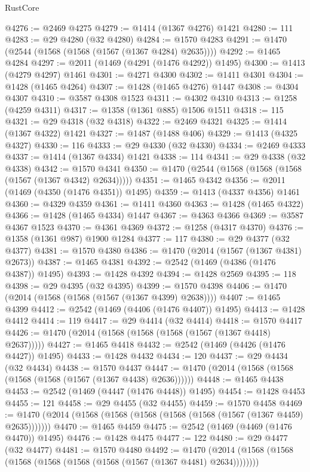\begin{lexlean}{RustCore}
\begin{coremodule}
@4276 := @2469 @4275
@4279 := @1414 (@1367 @4276) @1421
@4280 := 111
@4283 := @29 @4280 (@32 @4280)
@4284 := @1570 @4283
@4291 := @1470 (@2544 (@1568 (@1568 (@1567 (@1367 @4284) @2635))))
@4292 := @1465 @4284
@4297 := @2011 (@1469 (@4291 (@1476 @4292)) @1495)
@4300 := @1413 (@4279 @4297) @1461
@4301 := @4271 @4300
@4302 := @1411 @4301
@4304 := @1428 (@1465 @4264)
@4307 := @1428 (@1465 @4276) @1447
@4308 := @4304 @4307
@4310 := @3587 @4308 @1523
@4311 := @4302 @4310
@4313 := @1258 (@4259 @4311)
@4317 := @1358 (@1361 @885) @1506 @1511
@4318 := 115
@4321 := @29 @4318 (@32 @4318)
@4322 := @2469 @4321
@4325 := @1414 (@1367 @4322) @1421
@4327 := @1487 (@1488 @406)
@4329 := @1413 (@4325 @4327)
@4330 := 116
@4333 := @29 @4330 (@32 @4330)
@4334 := @2469 @4333
@4337 := @1414 (@1367 @4334) @1421
@4338 := 114
@4341 := @29 @4338 (@32 @4338)
@4342 := @1570 @4341
@4350 := @1470 (@2544 (@1568 (@1568 (@1568 (@1567 (@1367 @4342) @2634)))))
@4351 := @1465 @4342
@4356 := @2011 (@1469 (@4350 (@1476 @4351)) @1495)
@4359 := @1413 (@4337 @4356) @1461
@4360 := @4329 @4359
@4361 := @1411 @4360
@4363 := @1428 (@1465 @4322)
@4366 := @1428 (@1465 @4334) @1447
@4367 := @4363 @4366
@4369 := @3587 @4367 @1523
@4370 := @4361 @4369
@4372 := @1258 (@4317 @4370)
@4376 := @1358 (@1361 @987) @1900 @1284
@4377 := 117
@4380 := @29 @4377 (@32 @4377)
@4381 := @1570 @4380
@4386 := @1470 (@2014 (@1567 (@1367 @4381) @2673))
@4387 := @1465 @4381
@4392 := @2542 (@1469 (@4386 (@1476 @4387)) @1495)
@4393 := @1428 @4392
@4394 := @1428 @2569
@4395 := 118
@4398 := @29 @4395 (@32 @4395)
@4399 := @1570 @4398
@4406 := @1470 (@2014 (@1568 (@1568 (@1567 (@1367 @4399) @2638))))
@4407 := @1465 @4399
@4412 := @2542 (@1469 (@4406 (@1476 @4407)) @1495)
@4413 := @1428 @4412
@4414 := 119
@4417 := @29 @4414 (@32 @4414)
@4418 := @1570 @4417
@4426 := @1470 (@2014 (@1568 (@1568 (@1568 (@1567 (@1367 @4418) @2637)))))
@4427 := @1465 @4418
@4432 := @2542 (@1469 (@4426 (@1476 @4427)) @1495)
@4433 := @1428 @4432
@4434 := 120
@4437 := @29 @4434 (@32 @4434)
@4438 := @1570 @4437
@4447 := @1470 (@2014 (@1568 (@1568 (@1568 (@1568 (@1567 (@1367 @4438) @2636))))))
@4448 := @1465 @4438
@4453 := @2542 (@1469 (@4447 (@1476 @4448)) @1495)
@4454 := @1428 @4453
@4455 := 121
@4458 := @29 @4455 (@32 @4455)
@4459 := @1570 @4458
@4469 := @1470 (@2014 (@1568 (@1568 (@1568 (@1568 (@1568 (@1567 (@1367 @4459) @2635)))))))
@4470 := @1465 @4459
@4475 := @2542 (@1469 (@4469 (@1476 @4470)) @1495)
@4476 := @1428 @4475
@4477 := 122
@4480 := @29 @4477 (@32 @4477)
@4481 := @1570 @4480
@4492 := @1470 (@2014 (@1568 (@1568 (@1568 (@1568 (@1568 (@1568 (@1567 (@1367 @4481) @2634))))))))

\end{coremodule}
\end{lexlean}
